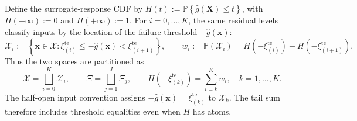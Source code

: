 \documentclass[review,11pt,3p,authoryear,nopreprintline]{elsarticle}
\begin{document}
Define the surrogate-response CDF by $H(t):=\mathbb P\left\{\hat g(\bm X)\le t\right\}$, with $H(-\infty):=0$ and $H(+\infty):=1$. For $i=0,\ldots,K$, the same residual levels classify inputs by the location of the failure threshold $-\hat g(\bm x)$:
\begin{equation}
  \mathcal X_i:=\left\{\bm x\in\mathcal X:
    \xi_{(i)}^{\mathrm{te}}\le-\hat g(\bm x)<\xi_{(i+1)}^{\mathrm{te}}\right\},
  \qquad
  w_i:=\mathbb P(\mathcal X_i)
    =H\left(-\xi_{(i)}^{\mathrm{te}}\right)-H\left(-\xi_{(i+1)}^{\mathrm{te}}\right).
  \label{eq-input-cells}
\end{equation}
Thus the two spaces are partitioned as
\[
  \mathcal X=\bigsqcup_{i=0}^{K}\mathcal X_i,
  \qquad
  \Xi=\bigsqcup_{j=1}^{J}\Xi_j,
  \qquad
  H\left(-\xi_{(k)}^{\mathrm{te}}\right)=\sum_{i=k}^{K}w_i,
  \quad k=1,\ldots,K.
\]
The half-open input convention assigns $-\hat g(\bm x)=\xi_{(k)}^{\mathrm{te}}$ to $\mathcal X_k$. The tail sum therefore includes threshold equalities even when $H$ has atoms.
\end{document}
